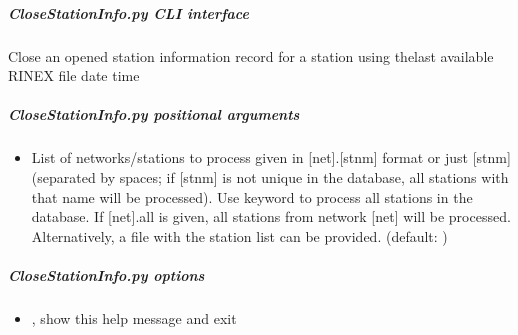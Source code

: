 \documentclass[letterpaper,10pt,english]{sphinxmanual}
\begin{document}
\begin{fulllineitems}
\label{\detokenize{pgamit.com:pgamit.com.CloseStationInfo.main}}
\pysigstartsignatures
\pysiglinewithargsret
{}
{}
{}
\pysigstopsignatures
\end{fulllineitems}



\subparagraph{CloseStationInfo.py \sphinxhyphen{} CLI interface}
\label{\detokenize{pgamit.com:CloseStationInfo.py---CLI-interface}}
\sphinxAtStartPar
Close an opened station information record for a station using thelast available RINEX file date time

\begin{sphinxVerbatim}[commandchars=\\\{\}]
 \PYG{p}{[}\PYG{p}{]}  \PYG{p}{[} \PYG{p}{]}
\end{sphinxVerbatim}


\subparagraph{CloseStationInfo.py positional arguments}
\label{\detokenize{pgamit.com:CloseStationInfo.py-positional-arguments}}\begin{itemize}
\item {} 
\sphinxAtStartPar
{\hyperref[\detokenize{pgamit.com:CloseStationInfo.py-all|net.stnm}]{}} \sphinxhyphen{} List of networks/stations to process given in {[}net{]}.{[}stnm{]} format or just {[}stnm{]} (separated by spaces; if {[}stnm{]} is not unique in the database, all stations with that name will be processed). Use keyword  to process all stations in the database. If {[}net{]}.all is given, all stations from network {[}net{]} will be processed. Alternatively, a file with the station list can be provided. (default: )

\end{itemize}


\subparagraph{CloseStationInfo.py options}
\label{\detokenize{pgamit.com:CloseStationInfo.py-options}}\begin{itemize}
\item {} 
\sphinxAtStartPar
{\hyperref[\detokenize{pgamit.com:CloseStationInfo.py--h}]{}}, {\hyperref[\detokenize{pgamit.com:CloseStationInfo.py---help}]{}} \sphinxhyphen{} show this help message and exit

\end{itemize}
\end{document}
